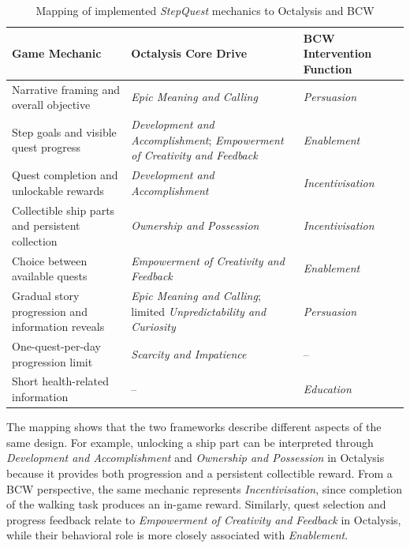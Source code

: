 \begin{table}[h]
	\centering
	\caption{Mapping of implemented \textit{StepQuest} mechanics to Octalysis and BCW}
	\label{tab:implemented_mapping}
	\begin{tabular}{p{} p{} p{}}
		\hline
		\textbf{Game Mechanic} & \textbf{Octalysis Core Drive} & \textbf{BCW Intervention Function} \\
		\hline
		
		Narrative framing and overall objective &
		\textit{Epic Meaning and Calling} &
		\textit{Persuasion} \\
		
		Step goals and visible quest progress &
		\textit{Development and Accomplishment}; 
		\textit{Empowerment of Creativity and Feedback} &
		\textit{Enablement} \\
		
		Quest completion and unlockable rewards &
		\textit{Development and Accomplishment} &
		\textit{Incentivisation} \\
		
		Collectible ship parts and persistent collection &
		\textit{Ownership and Possession} &
		\textit{Incentivisation} \\
		
		Choice between available quests &
		\textit{Empowerment of Creativity and Feedback} &
		\textit{Enablement} \\
		
		Gradual story progression and information reveals &
		\textit{Epic Meaning and Calling};
		limited \textit{Unpredictability and Curiosity} &
		\textit{Persuasion} \\
		
		One-quest-per-day progression limit &
		\textit{Scarcity and Impatience} &
		-- \\
		
		Short health-related information &
		-- &
		\textit{Education} \\
		
		\hline
	\end{tabular}
\end{table}

The mapping shows that the two frameworks describe different aspects of the same design. For example, unlocking a ship part can be interpreted through \textit{Development and Accomplishment} and \textit{Ownership and Possession} in Octalysis because it provides both progression and a persistent collectible reward. From a BCW perspective, the same mechanic represents \textit{Incentivisation}, since completion of the walking task produces an in-game reward. Similarly, quest selection and progress feedback relate to \textit{Empowerment of Creativity and Feedback} in Octalysis, while their behavioral role is more closely associated with \textit{Enablement}.


